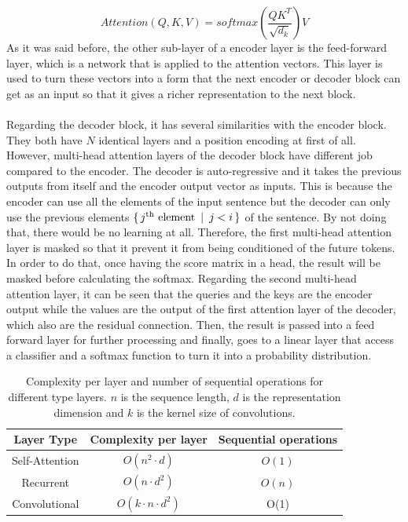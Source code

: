 \documentclass[11pt, a4paper]{article}
\begin{document}
	\[Attention(Q, K, V) = softmax(\frac{QK^T}{\sqrt{d_k}}) V\]
	As it was said before, the other sub-layer of a encoder layer is the feed-forward layer, which is a network that is applied to the attention vectors. This layer is used to turn these vectors into a form that the next encoder or decoder block can get as an input so that it gives a richer representation to the next block.
	\\
	\\
	Regarding the decoder block, it has several similarities with the encoder block. They both have $N$ identical layers and a position encoding at first of all. However, multi-head attention layers of the decoder block have different job compared to the encoder. The decoder is auto-regressive and it takes the previous outputs from itself and the encoder output vector as inputs. This is because the encoder can use all the elements of the input sentence  but the decoder can only use the previous elements $\{ \, j\text{\textsuperscript{th} element} \, \, \, | \, \, \, j < i \, \}$ of the sentence. By not doing that, there would be no learning at all.
	Therefore, the first multi-head attention layer is masked so that it prevent it from being conditioned of the future tokens. In order to do that, once having the score matrix in a head, the result will be masked before calculating the softmax. Regarding the second multi-head attention layer, it can be seen that the queries and the keys are the encoder output while the values are the output of the first attention layer of the decoder, which also are the residual connection. Then, the result is passed into a feed forward layer for further processing and finally, goes to a linear layer that access a classifier and a softmax function to turn it into a probability distribution.
	\begin{table}[H]
		\centering
		\caption{Complexity per layer and number of sequential operations for different type layers. $n$ is the sequence length, $d$ is the representation dimension and $k$ is the kernel size of convolutions.}
		\begin{tabular}{c|cc}
			Layer Type & Complexity per layer & Sequential operations\\\hline
			Self-Attention & $O(n^2 \cdot d)$ & $O(1)$\\
			Recurrent & $O(n \cdot d^2)$ & $O(n)$ \\
			Convolutional &  $O(k \cdot n \cdot d^2)$ & O(1)\\
		\end{tabular}
	\end{table}
\end{document}
